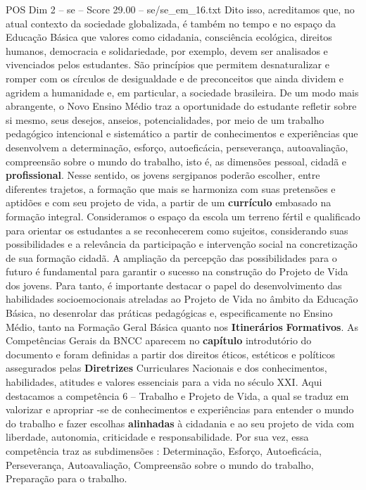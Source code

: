 \begin{textsample}{POS Dim 2 – se – Score 29.00 – se/se\_em\_16.txt}
Dito isso, acreditamos que, no atual contexto da sociedade globalizada, é também no tempo e no espaço da Educação Básica que valores como cidadania, consciência ecológica, direitos humanos, democracia e solidariedade, por exemplo, devem ser analisados e vivenciados pelos estudantes.
São princípios que permitem desnaturalizar e romper com os círculos de desigualdade e de preconceitos que ainda dividem e agridem a humanidade e, em particular, a sociedade brasileira.
De um modo mais abrangente, o Novo Ensino Médio traz a oportunidade do estudante refletir sobre si mesmo, seus desejos, anseios, potencialidades, por meio de um trabalho pedagógico intencional e sistemático a partir de conhecimentos e experiências que desenvolvem a determinação, esforço, autoeficácia, perseverança, autoavaliação, compreensão sobre o mundo do trabalho, isto é, as dimensões pessoal, cidadã e \textbf{profissional}.
Nesse sentido, os jovens sergipanos poderão escolher, entre diferentes trajetos, a formação que mais se harmoniza com suas pretensões e aptidões e com seu projeto de vida, a partir de um \textbf{currículo} embasado na formação integral.
Consideramos o espaço da escola um terreno fértil e qualificado para orientar os estudantes a se reconhecerem como sujeitos, considerando suas possibilidades e a relevância da participação e intervenção social na concretização de sua formação cidadã.
A ampliação da percepção das possibilidades para o futuro é fundamental para garantir o sucesso na construção do Projeto de Vida dos jovens.
Para tanto, é importante destacar o papel do desenvolvimento das habilidades socioemocionais atreladas ao Projeto de Vida no âmbito da Educação Básica, no desenrolar das práticas pedagógicas e, especificamente no Ensino Médio, tanto na Formação Geral Básica quanto nos \textbf{Itinerários} \textbf{Formativos}.
As Competências Gerais da BNCC aparecem no \textbf{capítulo} introdutório do documento e foram definidas a partir dos direitos éticos, estéticos e políticos assegurados pelas \textbf{Diretrizes} Curriculares Nacionais e dos conhecimentos, habilidades, atitudes e valores essenciais para a vida no século XXI.
Aqui destacamos a competência 6 – Trabalho e Projeto de Vida, a qual se traduz em valorizar e apropriar -se de conhecimentos e experiências para entender o mundo do trabalho e fazer escolhas \textbf{alinhadas} à cidadania e ao seu projeto de vida com liberdade, autonomia, criticidade e responsabilidade.
Por sua vez, essa competência traz as subdimensões : Determinação, Esforço, Autoeficácia, Perseverança, Autoavaliação, Compreensão sobre o mundo do trabalho, Preparação para o trabalho.

\end{textsample}
